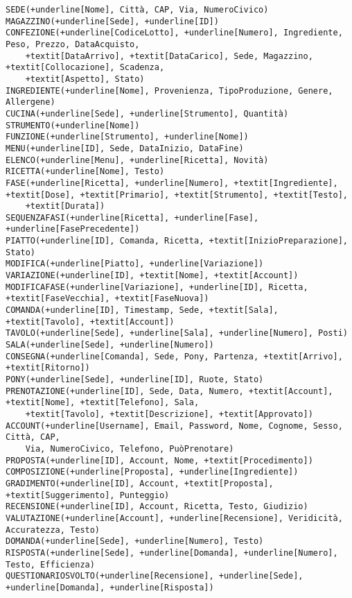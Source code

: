\begin{Verbatim}[commandchars=+\[\]]
SEDE(+underline[Nome], Città, CAP, Via, NumeroCivico)
MAGAZZINO(+underline[Sede], +underline[ID])
CONFEZIONE(+underline[CodiceLotto], +underline[Numero], Ingrediente, Peso, Prezzo, DataAcquisto,
    +textit[DataArrivo], +textit[DataCarico], Sede, Magazzino, +textit[Collocazione], Scadenza,
    +textit[Aspetto], Stato)
INGREDIENTE(+underline[Nome], Provenienza, TipoProduzione, Genere, Allergene)
CUCINA(+underline[Sede], +underline[Strumento], Quantità)
STRUMENTO(+underline[Nome])
FUNZIONE(+underline[Strumento], +underline[Nome])
MENU(+underline[ID], Sede, DataInizio, DataFine)
ELENCO(+underline[Menu], +underline[Ricetta], Novità)
RICETTA(+underline[Nome], Testo)
FASE(+underline[Ricetta], +underline[Numero], +textit[Ingrediente], +textit[Dose], +textit[Primario], +textit[Strumento], +textit[Testo],
    +textit[Durata])
SEQUENZAFASI(+underline[Ricetta], +underline[Fase], +underline[FasePrecedente])
PIATTO(+underline[ID], Comanda, Ricetta, +textit[InizioPreparazione], Stato)
MODIFICA(+underline[Piatto], +underline[Variazione])
VARIAZIONE(+underline[ID], +textit[Nome], +textit[Account])
MODIFICAFASE(+underline[Variazione], +underline[ID], Ricetta, +textit[FaseVecchia], +textit[FaseNuova])
COMANDA(+underline[ID], Timestamp, Sede, +textit[Sala], +textit[Tavolo], +textit[Account])
TAVOLO(+underline[Sede], +underline[Sala], +underline[Numero], Posti)
SALA(+underline[Sede], +underline[Numero])
CONSEGNA(+underline[Comanda], Sede, Pony, Partenza, +textit[Arrivo], +textit[Ritorno])
PONY(+underline[Sede], +underline[ID], Ruote, Stato)
PRENOTAZIONE(+underline[ID], Sede, Data, Numero, +textit[Account], +textit[Nome], +textit[Telefono], Sala,
    +textit[Tavolo], +textit[Descrizione], +textit[Approvato])
ACCOUNT(+underline[Username], Email, Password, Nome, Cognome, Sesso, Città, CAP,
    Via, NumeroCivico, Telefono, PuòPrenotare)
PROPOSTA(+underline[ID], Account, Nome, +textit[Procedimento])
COMPOSIZIONE(+underline[Proposta], +underline[Ingrediente])
GRADIMENTO(+underline[ID], Account, +textit[Proposta], +textit[Suggerimento], Punteggio)
RECENSIONE(+underline[ID], Account, Ricetta, Testo, Giudizio)
VALUTAZIONE(+underline[Account], +underline[Recensione], Veridicità, Accuratezza, Testo)
DOMANDA(+underline[Sede], +underline[Numero], Testo)
RISPOSTA(+underline[Sede], +underline[Domanda], +underline[Numero], Testo, Efficienza)
QUESTIONARIOSVOLTO(+underline[Recensione], +underline[Sede], +underline[Domanda], +underline[Risposta])
\end{Verbatim}
